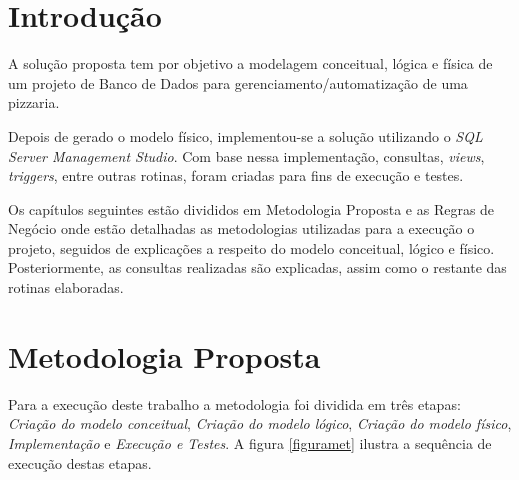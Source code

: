 \documentclass[
	12pt,				%
	openright,			%
	oneside,			%
	a4paper,			%
	chapter=TITLE,		%
	section=TITLE,		%
	english,			%
	brazil				%
	]{abntex2}
\begin{document}

\tableofcontents*
\cleardoublepage

\textual

\chapter*[Introdução]{Introdução}
    A solução proposta tem por objetivo a modelagem conceitual, lógica e física de um projeto de Banco de Dados
    para gerenciamento/automatização de uma pizzaria. 

    Depois de gerado o modelo físico, implementou-se a solução utilizando o \textit{SQL Server Management Studio}. 
    Com base nessa implementação, consultas, \textit{views}, \textit{triggers}, entre outras rotinas, foram criadas para 
    fins de execução e testes.
    
    Os capítulos seguintes estão divididos em Metodologia Proposta e as Regras de Negócio onde estão detalhadas as metodologias utilizadas para a 
    execução o projeto, seguidos de explicações a respeito do modelo conceitual, lógico e físico. Posteriormente, 
    as consultas realizadas são explicadas, assim como o restante das rotinas elaboradas.

\chapter{Metodologia Proposta}

Para a execução deste trabalho a metodologia foi dividida em três 
etapas: \emph{Criação do modelo conceitual}, \emph{Criação do modelo lógico}, 
\emph{Criação do modelo físico}, \emph{Implementação} e \emph{Execução e Testes}. 
A figura \ref{figuramet} ilustra a sequência de execução destas etapas.
\end{document}
